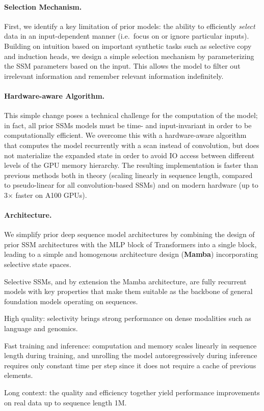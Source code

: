 \paragraph{Selection Mechanism.} First, we identify a key limitation of prior models: the ability to efficiently \emph{select} data in an input-dependent manner (i.e.\ focus on or ignore particular inputs). Building on intuition based on important synthetic tasks such as selective copy and induction heads, we design a simple selection mechanism by parameterizing the SSM parameters based on the input. This allows the model to filter out irrelevant information and remember relevant information indefinitely.

\paragraph{Hardware-aware Algorithm.} This simple change poses a technical challenge for the computation of the model; in fact, all prior SSMs models must be time- and input-invariant in order to be computationally efficient. We overcome this with a hardware-aware algorithm that computes the model recurrently with a scan instead of convolution, but does not materialize the expanded state in order to avoid IO access between different levels of the GPU memory hierarchy. The resulting implementation is faster than previous methods both in theory (scaling linearly in sequence length, compared to pseudo-linear for all convolution-based SSMs) and on modern hardware (up to 3$\times$ faster on A100 GPUs).

\paragraph{Architecture.}
We simplify prior deep sequence model architectures by combining the design of prior SSM architectures \citep{dao2023hungry} with the MLP block of Transformers into a single block, leading to a simple and homogenous architecture design (\textbf{Mamba}) incorporating selective state spaces.

Selective SSMs, and by extension the Mamba architecture, are fully recurrent models with key properties that make them suitable as the backbone of general foundation models operating on sequences.

\begin{enumerate*}[label=(\roman*)]
\item High quality: selectivity brings strong performance on dense modalities such as language and genomics.
\item Fast training and inference: computation and memory scales linearly in sequence length during training, and unrolling the model autoregressively during inference requires only constant time per step since it does not require a cache of previous elements.
\item Long context: the quality and efficiency together yield performance improvements on real data up to sequence length 1M.
\end{enumerate*}

